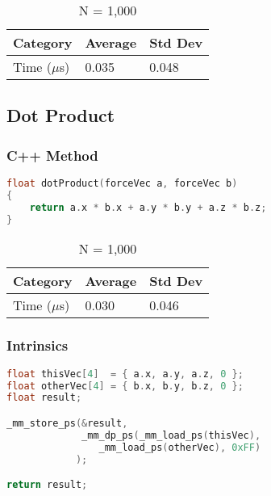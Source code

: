 \documentclass{article}
\begin{document}
\vspace{3mm}

\begin{table}[ht!]
\centering
\begin{tabular}{l|l|l}
Category        &   Average &   Std Dev \\
\hline
Time ($\mu$s)    &   0.035   &   0.048   \\
\end{tabular}
\caption{N = 1,000}
\end{table}

\subsection{Dot Product}

\subsubsection{C++ Method}

\begin{lstlisting}[language=C++]
float dotProduct(forceVec a, forceVec b)
{
	return a.x * b.x + a.y * b.y + a.z * b.z;
}
\end{lstlisting}

\vspace{3mm}

\begin{table}[ht!]
\centering
\begin{tabular}{l|l|l}
Category        &   Average &   Std Dev \\
\hline
Time ($\mu$s)    &   0.030   &   0.046   \\
\end{tabular}
\caption{N = 1,000}
\end{table}

\vspace{5mm}

\subsubsection{Intrinsics}

\begin{lstlisting}[language=C++]
float thisVec[4]  = { a.x, a.y, a.z, 0 };
float otherVec[4] = { b.x, b.y, b.z, 0 };
float result;

_mm_store_ps(&result,
			 _mm_dp_ps(_mm_load_ps(thisVec), 
			    _mm_load_ps(otherVec), 0xFF)
		    );

return result;
\end{lstlisting}
\end{document}

